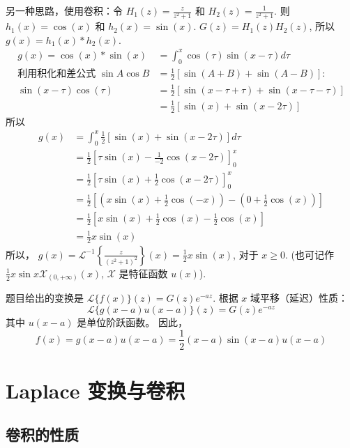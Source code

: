 \documentclass[linespread=1.5,openany]{book}%
\def\diff{d}%
\theoremstyle{plain}
\newcommand{\diff}{\mathop{}\!\mathrm{d}}  %
\begin{document}
{{{{						另一种思路，使用卷积：令 $H_1(z) = \frac{z}{z^2+1}$ 和 $H_2(z) = \frac{1}{z^2+1}$.
						则 $h_1(x) = \cos(x)$ 和 $h_2(x) = \sin(x)$.
						$G(z) = H_1(z)H_2(z)$, 所以 $g(x) = h_1(x) * h_2(x)$.
						\begin{align*}
							g(x) = \cos(x) * \sin(x) &= \int_{0}^{x} \cos(\tau)\sin(x-\tau) \diff \tau \\
							\text{利用积化和差公式 } \sin A \cos B &= \frac{1}{2}[\sin(A+B) + \sin(A-B)]: \\
							\sin(x-\tau)\cos(\tau) &= \frac{1}{2}[\sin(x-\tau+\tau) + \sin(x-\tau-\tau)] \\
							&= \frac{1}{2}[\sin(x) + \sin(x-2\tau)]
						\end{align*}
						所以
						\begin{align*}
							g(x) &= \int_{0}^{x} \frac{1}{2}[\sin(x) + \sin(x-2\tau)] \diff \tau \\
							&= \frac{1}{2} \left[ \tau\sin(x) - \frac{1}{-2}\cos(x-2\tau) \right]_{0}^{x} \\
							&= \frac{1}{2} \left[ \tau\sin(x) + \frac{1}{2}\cos(x-2\tau) \right]_{0}^{x} \\
							&= \frac{1}{2} \left[ \left(x\sin(x) + \frac{1}{2}\cos(-x)\right) - \left(0 + \frac{1}{2}\cos(x)\right) \right] \\
							&= \frac{1}{2} \left[ x\sin(x) + \frac{1}{2}\cos(x) - \frac{1}{2}\cos(x) \right] \\
							&= \frac{1}{2} x\sin(x)
						\end{align*}
						所以， $g(x) = \mathcal{L}^{-1}\left\{\frac{z}{(z^2+1)^2}\right\}(x) = \frac{1}{2}x\sin(x)$, 对于 $x \ge 0$.
						(也可记作 $\frac{1}{2}x\sin x \mathcal{X}_{(0,+\infty)}(x)$, $\mathcal{X}$ 是特征函数 $u(x)$).
						
						题目给出的变换是 $\mathcal{L}\{f(x)\}(z) = G(z)e^{-az}$.
						根据 $x$ 域平移（延迟）性质：
						\[ \mathcal{L}\{g(x-a)u(x-a)\}(z) = G(z)e^{-az} \]
						其中 $u(x-a)$ 是单位阶跃函数。
						因此，
						\[ f(x) = g(x-a)u(x-a) = \frac{1}{2}(x-a)\sin(x-a)u(x-a) \]
					} %
					
					{\chapter{Laplace 变换与卷积 }
						{ %
							
							\section{卷积的性质}
							{ %
								
}}}}}}
\end{document}
